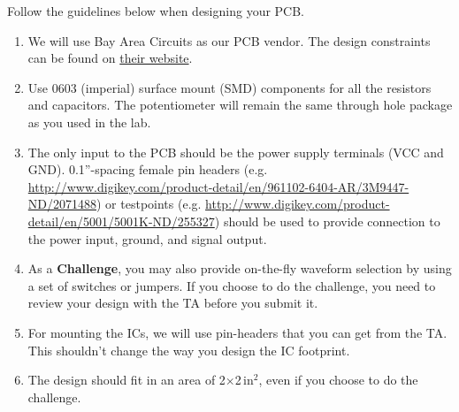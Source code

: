 \documentclass[letterpaper, 11pt]{article}
\begin{document}
Follow the guidelines below when designing your PCB. 
\begin{enumerate}
	\item We will use Bay Area Circuits as our PCB vendor. The design constraints can be found on \href{http://store.bayareacircuits.com/student-special/}{their website}. 
	
	\item Use 0603 (imperial) surface mount (SMD) components for all the resistors and capacitors. The potentiometer will remain the same through hole package as you used in the lab. 
	
	\item The only input to the PCB should be the power supply terminals (VCC and GND). 0.1''-spacing female pin headers (e.g. \url{http://www.digikey.com/product-detail/en/961102-6404-AR/3M9447-ND/2071488}) or testpoints (e.g. \url{http://www.digikey.com/product-detail/en/5001/5001K-ND/255327}) should be used to provide connection to the power input, ground, and signal output. 
	
	\item As a \textbf{Challenge}, you may also provide on-the-fly waveform selection by using a set of switches or jumpers. If you choose to do the challenge, you need to review your design with the TA before you submit it.
	
	\item For mounting the ICs, we will use pin-headers that you can get from the TA. This shouldn't change the way you design the IC footprint. 
	
	\item The design should fit in an area of 2$\times$2\,in$^2$, even if you choose to do the challenge.
	

\end{enumerate}
\end{document}
